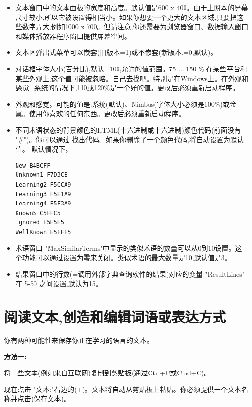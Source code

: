 \documentclass[cn,10pt,math=newtx,citestyle=gb7714-2015,bibstyle=gb7714-2015]{elegantbook}
\begin{document}
\begin{itemize}
    \item 文本窗口中的文本面板的宽度和高度。默认值是600 x 400。由于上网本的屏幕尺寸较小,所以它被设置得相当小。如果你想要一个更大的文本区域,只要把这些数字弄大,例如1000 x 700。但请注意,你还需要为浏览器窗口、数据输入窗口和媒体播放器程序窗口提供屏幕空间。

     \item 文本区弹出式菜单可以嵌套(旧版本=1)或不嵌套(新版本,=0,默认)。
     \item 对话框字体大小(百分比),默认=100,允许的值范围。75 ... 150 \%.在某些平台和某些外观上,这个值可能被忽略。自己去找吧。特别是在Windows上。在外观和感觉=系统的情况下,110或120\%是一个好的值。更改后必须重新启动程序。
     \item 外观和感觉。可能的值是:系统(默认)、Nimbus(字体大小必须是100\%)或金属。使用你喜欢的任何东西。更改后必须重新启动程序。
     \item  不同术语状态的背景颜色的HTML(十六进制或十六进制)颜色代码(前面没有 "\#")。你可以通过 \href{https://htmlcolorcodes.com/} 找出代码。如果你删除了一个颜色代码,将自动设置为默认值。
     默认情况下。
     \begin{lstlisting}
New B4BCFF
Unknown1 F7D3CB
Learning2 F5CCA9
Learning3 F5E1A9
Learning4 F5F3A9
Known5 C5FFC5
Ignored E5E5E5
WellKnown E5FFE5
     \end{lstlisting}

     \item 术语窗口 "MaxSimilarTerms"中显示的类似术语的数量可以从0到10设置。这个功能可以通过设置为零来关闭。类似术语的最大数量是10,默认值是3。
     \item 结果窗口中的行数(=调用外部字典查询软件的结果)对应的变量 "ResultLines" 在 5-50 之间设置,默认为15。
\end{itemize}

\chapter{阅读文本,创造和编辑词语或表达方式}\label{阅读文本,创造和编辑词语或表达方式}
你有两种可能性来保存你正在学习的语言的文本。

\textbf{方法一:}

将一些文本(例如来自互联网)复制到剪贴板(通过Ctrl+C或Cmd+C)。

现在点击 "文本:"右边的(+)。文本将自动从剪贴板上粘贴。你必须提供一个文本名称并点击(保存文本)。
\end{document}
